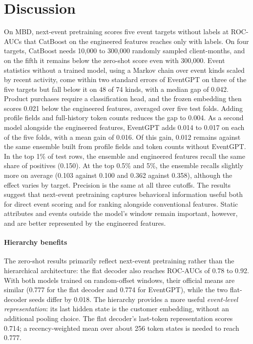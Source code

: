 \documentclass[12pt]{article}
\begin{document}
\section{Discussion}\label{sec:discussion}

On MBD, next-event pretraining scores five event targets without labels at ROC-AUCs that CatBoost on the engineered features reaches only with labels. On four targets, CatBoost needs 10,000 to 300,000 randomly sampled client-months, and on the fifth it remains below the zero-shot score even with 300,000. Event statistics without a trained model, using a Markov chain over event kinds scaled by recent activity, come within two standard errors of EventGPT on three of the five targets but fall below it on 48 of 74 kinds, with a median gap of 0.042. Product purchases require a classification head, and the frozen embedding then scores 0.021 below the engineered features, averaged over five test folds. Adding profile fields and full-history token counts reduces the gap to 0.004. As a second model alongside the engineered features, EventGPT adds 0.014 to 0.017 on each of the five folds, with a mean gain of 0.016. Of this gain, 0.012 remains against the same ensemble built from profile fields and token counts without EventGPT. In the top 1\% of test rows, the ensemble and engineered features recall the same share of positives (0.150). At the top 0.5\% and 5\%, the ensemble recalls slightly more on average (0.103 against 0.100 and 0.362 against 0.358), although the effect varies by target. Precision is the same at all three cutoffs. The results suggest that next-event pretraining captures behavioral information useful both for direct event scoring and for ranking alongside conventional features. Static attributes and events outside the model's window remain important, however, and are better represented by the engineered features.

\paragraph{Hierarchy benefits} 
The zero-shot results primarily reflect next-event pretraining rather than the hierarchical architecture: the flat decoder also reaches ROC-AUCs of 0.78 to 0.92. With both models trained on random-offset windows, their official means are similar (0.777 for the flat decoder and 0.774 for EventGPT), while the two flat-decoder seeds differ by 0.018. The hierarchy provides a more useful \emph{event-level representation}: its last hidden state is the customer embedding, without an additional pooling choice. The flat decoder's last-token representation scores 0.714; a recency-weighted mean over about 256 token states is needed to reach 0.777.
\end{document}
